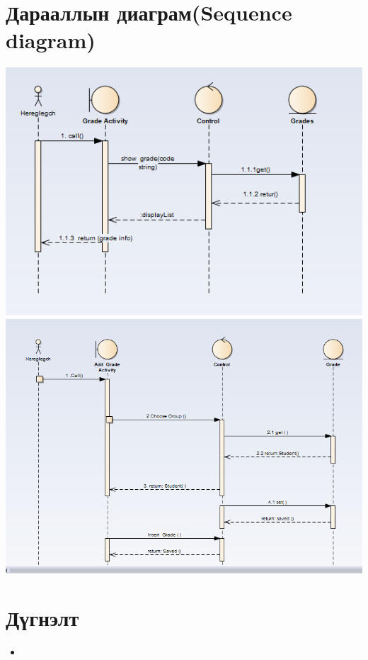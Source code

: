 \documentclass[12pd]{article}
\begin{document}
	\section{Дарааллын  диаграм(Sequence diagram)}
	\includegraphics[width=\textheight]{se1}
	\includegraphics[width=\textheight]{se2}
\section {Дүгнэлт}
\begin{itemize}
	\item 
	\end{itemize}

	
					
				
\end{document}
